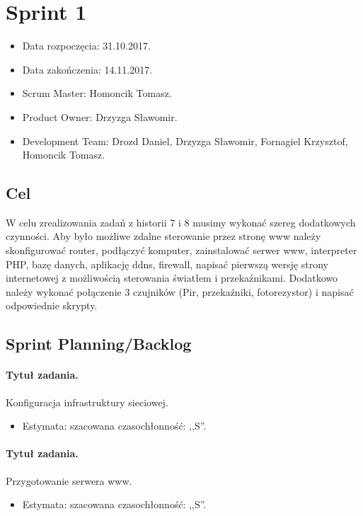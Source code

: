 \section{Sprint 1}
	\begin{itemize}
		\item Data rozpoczęcia: 31.10.2017.
		\item Data zakończenia: 14.11.2017.
		\item Scrum Master: Homoncik Tomasz.
		\item Product Owner: Drzyzga Sławomir.
		\item Development Team: Drozd Daniel, Drzyzga Sławomir, Fornagiel Krzysztof, Homoncik Tomasz.
	\end{itemize}
\subsection{Cel} 

	
	W celu zrealizowania zadań z historii 7 i 8 musimy wykonać szereg dodatkowych czynności. Aby było możliwe zdalne sterowanie przez stronę www należy skonfigurować router, podłączyć komputer, zainstalować serwer www, interpreter PHP, bazę danych, aplikację ddns, firewall, napisać pierwszą wersję strony internetowej z możliwością sterowania światłem i przekaźnikami. Dodatkowo należy wykonać połączenie 3 czujników (Pir, przekaźniki, fotorezystor) i napisać odpowiednie skrypty.
	
	
	
\subsection{Sprint Planning/Backlog}
	
	\paragraph{Tytuł zadania.} Konfiguracja infrastruktury sieciowej.
	\begin{itemize}
		\item Estymata: szacowana czasochłonność: ,,S''.
	\end{itemize}
	
	\paragraph{Tytuł zadania.} Przygotowanie serwera www.
	\begin{itemize}
		\item Estymata: szacowana czasochłonność: ,,S''.
	\end{itemize}
	
